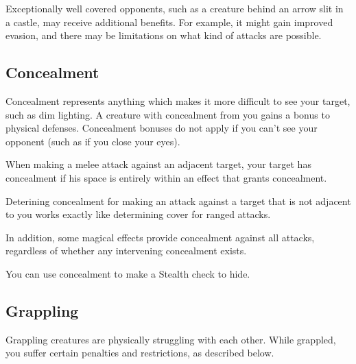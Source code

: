 Exceptionally well covered opponents, such as a creature behind an arrow slit in a castle, may receive additional benefits. For example, it might gain improved evasion, and there may be limitations on what kind of attacks are possible.

\subsection{Concealment}\label{Concealment}
Concealment represents anything which makes it more difficult to see your target, such as dim lighting. A creature with concealment from you gains a  bonus to physical defenses. Concealment bonuses do not apply if you can't see your opponent (such as if you close your eyes).

 When making a melee attack against an adjacent target, your target has concealment if his space is entirely within an effect that grants concealment.

Deterining concealment for making an attack against a target that is not adjacent to you works exactly like determining cover for ranged attacks.

In addition, some magical effects provide concealment against all attacks, regardless of whether any intervening concealment exists.

 You can use concealment to make a Stealth check to hide.

\subsection{Grappling}\label{Grappling}
Grappling creatures are physically struggling with each other. While grappled, you suffer certain penalties and restrictions, as described below. 


